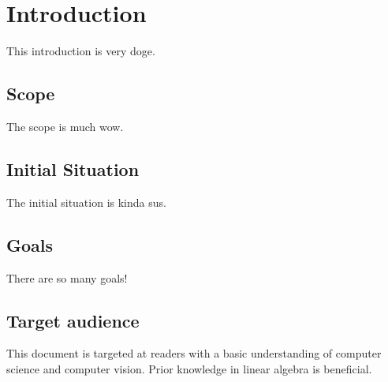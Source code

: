 \chapter{Introduction}
\label{sec:Introduction}
This introduction is very doge.
\section{Scope}
\label{sec:Scope}
The scope is much wow. 
\section{Initial Situation}
\label{sec:Situation}
The initial situation is kinda sus.
\section{Goals}
\label{sec:Goals}
There are so many goals!
\section{Target audience}
\label{sec:Ziel}
This document is targeted at readers with a basic understanding of computer science and computer vision. Prior knowledge in linear algebra is beneficial.
